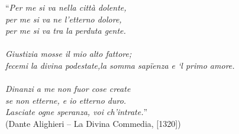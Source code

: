 \begin{epigrafe}
    \vspace*{\fill}
{%
    \noindent\hspace{.5\textwidth}
    {\begin{minipage}{.5\textwidth}
            ``\textit{Per me si va nella città dolente,\\
            per me si va ne l'etterno dolore,\\
            per me si va tra la perduta gente.\\\\
            Giustizia mosse il mio alto fattore;\\
            fecemi la divina podestate,la somma sapïenza e `l primo amore.\\\\
            Dinanzi a me non fuor cose create\\
            se non etterne, e io etterno duro.\\
            Lasciate ogne speranza, voi ch'intrate.}'' \\(Dante Alighieri {--} La Divina Commedia, [1320])
    \end{minipage}}%
    \vspace*{3cm}
}%
\end{epigrafe}
